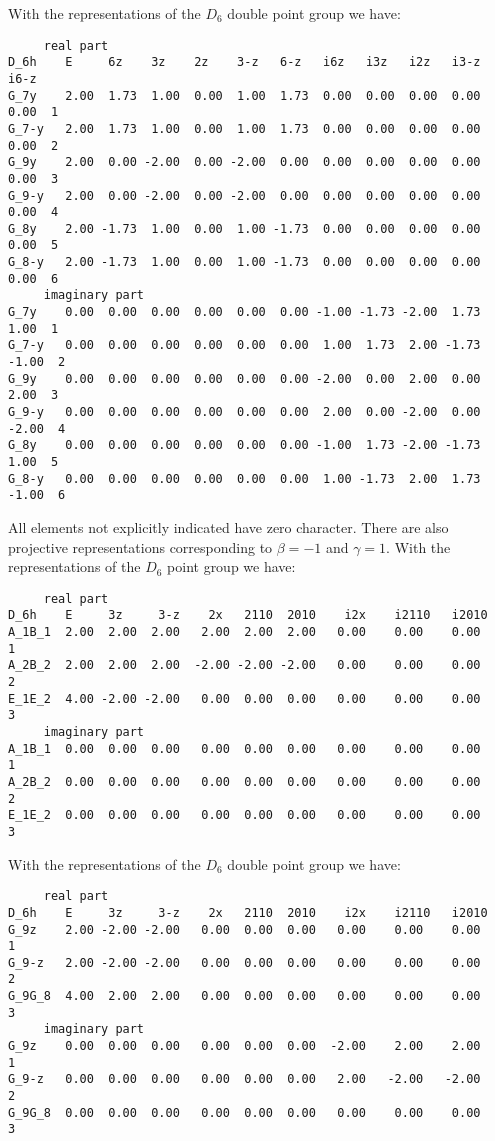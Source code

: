 \documentclass[12pt,a4paper]{article}
\begin{document}
With the representations of the $D_6$ double point group we have:
\begin{footnotesize}
\begin{verbatim}
     real part
D_6h    E     6z    3z    2z    3-z   6-z   i6z   i3z   i2z   i3-z   i6-z
G_7y    2.00  1.73  1.00  0.00  1.00  1.73  0.00  0.00  0.00  0.00   0.00  1
G_7-y   2.00  1.73  1.00  0.00  1.00  1.73  0.00  0.00  0.00  0.00   0.00  2
G_9y    2.00  0.00 -2.00  0.00 -2.00  0.00  0.00  0.00  0.00  0.00   0.00  3
G_9-y   2.00  0.00 -2.00  0.00 -2.00  0.00  0.00  0.00  0.00  0.00   0.00  4
G_8y    2.00 -1.73  1.00  0.00  1.00 -1.73  0.00  0.00  0.00  0.00   0.00  5
G_8-y   2.00 -1.73  1.00  0.00  1.00 -1.73  0.00  0.00  0.00  0.00   0.00  6
     imaginary part
G_7y    0.00  0.00  0.00  0.00  0.00  0.00 -1.00 -1.73 -2.00  1.73   1.00  1
G_7-y   0.00  0.00  0.00  0.00  0.00  0.00  1.00  1.73  2.00 -1.73  -1.00  2
G_9y    0.00  0.00  0.00  0.00  0.00  0.00 -2.00  0.00  2.00  0.00   2.00  3
G_9-y   0.00  0.00  0.00  0.00  0.00  0.00  2.00  0.00 -2.00  0.00  -2.00  4
G_8y    0.00  0.00  0.00  0.00  0.00  0.00 -1.00  1.73 -2.00 -1.73   1.00  5
G_8-y   0.00  0.00  0.00  0.00  0.00  0.00  1.00 -1.73  2.00  1.73  -1.00  6
\end{verbatim}
\end{footnotesize}
All elements not explicitly indicated have zero character.
There are also projective representations corresponding to $\beta=-1$ 
and $\gamma=1$. With the representations of the $D_6$ point group we have:  
\begin{footnotesize}
\begin{verbatim}
     real part
D_6h    E     3z     3-z    2x   2110  2010    i2x    i2110   i2010
A_1B_1  2.00  2.00  2.00   2.00  2.00  2.00   0.00    0.00    0.00     1
A_2B_2  2.00  2.00  2.00  -2.00 -2.00 -2.00   0.00    0.00    0.00     2
E_1E_2  4.00 -2.00 -2.00   0.00  0.00  0.00   0.00    0.00    0.00     3
     imaginary part
A_1B_1  0.00  0.00  0.00   0.00  0.00  0.00   0.00    0.00    0.00     1
A_2B_2  0.00  0.00  0.00   0.00  0.00  0.00   0.00    0.00    0.00     2
E_1E_2  0.00  0.00  0.00   0.00  0.00  0.00   0.00    0.00    0.00     3
\end{verbatim}
\end{footnotesize}
With the representations of the $D_6$ double point group we have:
\begin{footnotesize}
\begin{verbatim}
     real part
D_6h    E     3z     3-z    2x   2110  2010    i2x    i2110   i2010
G_9z    2.00 -2.00 -2.00   0.00  0.00  0.00   0.00    0.00    0.00     1
G_9-z   2.00 -2.00 -2.00   0.00  0.00  0.00   0.00    0.00    0.00     2
G_9G_8  4.00  2.00  2.00   0.00  0.00  0.00   0.00    0.00    0.00     3
     imaginary part
G_9z    0.00  0.00  0.00   0.00  0.00  0.00  -2.00    2.00    2.00     1
G_9-z   0.00  0.00  0.00   0.00  0.00  0.00   2.00   -2.00   -2.00     2
G_9G_8  0.00  0.00  0.00   0.00  0.00  0.00   0.00    0.00    0.00     3
\end{verbatim}
\end{footnotesize}
\end{document}

